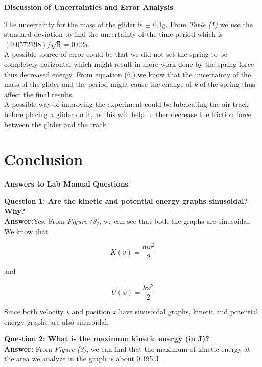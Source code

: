\documentclass{article}
\begin{document}
\begin{center}
\large\textbf{Discussion of Uncertainties and Error Analysis}
\end{center}

The uncertainty for the mass of the glider is $\pm$ 0.1g. From \textit{Table (1)} we use the standard deviation to find the uncertainty of the time period which is  $(0.0572198)/\sqrt{8} = 0.02s$.\\A possible source of error could be that we did not set the spring to be completely horizontal which might result in more work done by the spring force thus decreased energy. From equation (6.) we know that the uncertainty of the mass of the glider and the period might cause the change of \textit{k} of the spring thus affect the final results.\\A possible way of improving the experiment could be lubricating the air track before placing a glider on it, as this will help further decrease the friction force between the glider and the track.

\section{Conclusion}

\begin{center}
\large\textbf{Answers to Lab Manual Questions}
\end{center}

\textbf{Question 1: Are the kinetic and potential energy graphs sinusoidal? Why?}\\
\textbf{Answer:}Yes. From \textit{Figure (3)}, we can see that both the graphs are sinusoidal. We know that

\begin{equation}
K(v)=\frac{mv^2}{2}
\end{equation}

and

\begin{equation}
U(x)=\frac{kx^2}{2}
\end{equation}

Since both velocity \textit{v} and position \textit{x} have sinusoidal graphs, kinetic and potential energy graphs are also sinusoidal.

\textbf{Question 2: What is the maximum kinetic energy (in J)?}\\
\textbf{Answer:} From \textit{Figure (3)}, we can find that the maximum of kinetic energy at the area we analyze in the graph is about 0.195 J.
\end{document}
